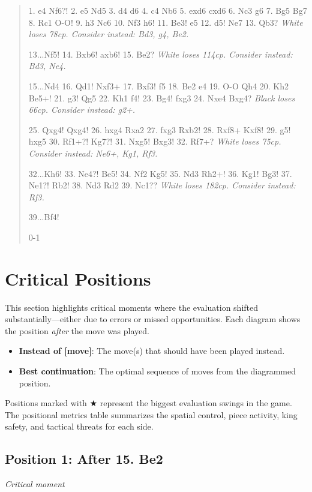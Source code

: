 \documentclass[11pt]{book}
\begin{document}
\begin{quote}
1. e4 Nf6?!
2. e5 Nd5
3. d4 d6
4. c4 Nb6
5. exd6 cxd6
6. Nc3 g6
7. Bg5 Bg7
8. Rc1 O-O!
9. h3 Nc6
10. Nf3 h6!
11. Be3! e5
12. d5! Ne7
13. Qb3?
\textit{White loses 78cp. Consider instead: Bd3, g4, Be2.}

13...Nf5!
14. Bxb6! axb6!
15. Be2?
\textit{White loses 114cp. Consider instead: Bd3, Ne4.}

15...Nd4
16. Qd1! Nxf3+
17. Bxf3! f5
18. Be2 e4
19. O-O Qh4
20. Kh2 Be5+!
21. g3! Qg5
22. Kh1 f4!
23. Bg4! fxg3
24. Nxe4 Bxg4?
\textit{Black loses 66cp. Consider instead: g2+.}

25. Qxg4! Qxg4!
26. hxg4 Rxa2
27. fxg3 Rxb2!
28. Rxf8+ Kxf8!
29. g5! hxg5
30. Rf1+?! Kg7?!
31. Nxg5! Bxg3!
32. Rf7+?
\textit{White loses 75cp. Consider instead: Ne6+, Kg1, Rf3.}

32...Kh6!
33. Ne4?! Be5!
34. Nf2 Kg5!
35. Nd3 Rh2+!
36. Kg1! Bg3!
37. Ne1?! Rb2!
38. Nd3 Rd2
39. Nc1??
\textit{White loses 182cp. Consider instead: Rf3.}

39...Bf4!

0-1
\end{quote}

\section{Critical Positions}

This section highlights critical moments where the evaluation shifted substantially---either due to errors or missed opportunities. Each diagram shows the position \emph{after} the move was played.

\begin{itemize}
\item \textbf{Instead of [move]}: The move(s) that should have been played instead.
\item \textbf{Best continuation}: The optimal sequence of moves from the diagrammed position.
\end{itemize}

Positions marked with {\color{blue}$\bigstar$} represent the biggest evaluation swings in the game. The positional metrics table summarizes the spatial control, piece activity, king safety, and tactical threats for each side.

\subsection*{Position 1: After 15. Be2}
\textit{Critical moment}
\end{document}
